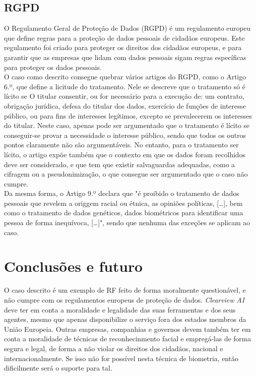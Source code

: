 \documentclass[12pt]{../diazessay}
\begin{document}
\subsection*{RGPD}
O Regulamento Geral de Proteção de Dados (RGPD) \parencite{rgpd} é um regulamento europeu que define regras para a proteção de dados pessoais de cidadãos europeus. Este regulamento foi criado para proteger os direitos dos cidadãos europeus, e para garantir que as empresas que lidam com dados pessoais sigam regras específicas para proteger os dados pessoais. \\
O caso como descrito consegue quebrar vários artigos do RGPD, como o Artigo 6.º, que define a licitude do tratamento. Nele se descreve que o tratamento só é lícito se O titular consentir, ou for necessário para a execução de: um contrato, obrigação jurídica, defesa do titular dos dados, exercício de funções de interesse público, ou para fins de interesses legítimos, excepto se prevalecerem os interesses do titular. Neste caso, apenas pode ser argumentado que o tratamento é lícito se conseguir-se provar a necessidade o interesse público, sendo que todos os outros pontos claramente não são argumentáveis. No entanto, para o tratamento ser lícito, o artigo expõe também que o contexto em que os dados foram recolhidos deve ser considerado, e que tem que existir salvaguardas adequadas, como a cifragem ou a pseudonimização, o que consegue ser argumentado que o caso não cumpre. \\
Da mesma forma, o Artigo 9.º declara que "é proibido o tratamento de dados pessoais que revelem a origgem racial ou étnica, as opiniões políticas, [\dots], bem como o tratamento de dados genéticos, dados biométricos para identificar uma pessoa de forma inequívoca, [\dots]", sendo que nenhuma das exceções se aplicam ao caso. \\
\section*{Conclusões e futuro}
O caso descrito é um exemplo de RF feito de forma moralmente questionável, e não cumpre com os regulamentos europeus de proteção de dados. \textit{Clearview AI} deve ter em conta a moralidade e legalidade das suas ferramentas e dos seus agentes, mesmo que apenas disponibilize o serviço fora dos estados membros da União Europeia. Outras empresas, companhias e governos devem também ter em conta a moralidade de técnicas de reconhecinmento facial e empregá-las de forma segura e legal, de forma a não violar os direitos dos cidadãos, nacional e internacionalmente. Se isso não for possível nesta técnica de biometria, então dificilmente será o suporte para tal. \\
\printbibliography[title=Referências]
\end{document}
